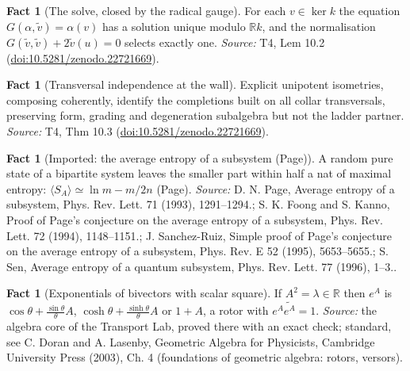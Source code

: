 \documentclass[11pt]{article}
\theoremstyle{definition}
\newtheorem{fact}[theorem]{Fact}
\theoremstyle{plain}
\newcommand{\changedmark}[2]{\marginpar{\raggedright\scriptsize\color{#1}#2}}
\providecommand{\R}{}\renewcommand{\R}{\mathbb{R}}
\begin{document}
\begin{fact}[The solve, closed by the radical gauge]\label{c:sheaf.solve-closed-radical-gauge}
For each $v \in \ker k$ the equation $G(\alpha, \tilde v) = \alpha(v)$ has a solution unique modulo $\R k$, and the normalisation $G(\tilde v, \tilde v) + 2\tilde v(u) = 0$ selects exactly one.
\emph{Source:} T4, Lem 10.2 (\href{https://doi.org/10.5281/zenodo.22721669}{doi:10.5281/zenodo.22721669}).
\end{fact}

\begin{fact}[Transversal independence at the wall]\label{c:sheaf.transversal-independence-wall}
Explicit unipotent isometries, composing coherently, identify the completions built on all collar transversals, preserving form, grading and degeneration subalgebra but not the ladder partner.
\emph{Source:} T4, Thm 10.3 (\href{https://doi.org/10.5281/zenodo.22721669}{doi:10.5281/zenodo.22721669}).
\end{fact}

\begin{fact}[Imported: the average entropy of a subsystem (Page)]\label{c:singularity.imported-page-average-entropy-subsystem}
\changedmark{BurntOrange}{changed since the deposit}
A random pure state of a bipartite system leaves the smaller part within half a nat of maximal entropy: $\langle S_A\rangle \simeq \ln m - m/2n$ (Page).
\emph{Source:} D. N. Page, Average entropy of a subsystem, Phys. Rev. Lett. 71 (1993), 1291--1294.; S. K. Foong and S. Kanno, Proof of Page's conjecture on the average entropy of a subsystem, Phys. Rev. Lett. 72 (1994), 1148--1151.; J. Sanchez-Ruiz, Simple proof of Page's conjecture on the average entropy of a subsystem, Phys. Rev. E 52 (1995), 5653--5655.; S. Sen, Average entropy of a quantum subsystem, Phys. Rev. Lett. 77 (1996), 1--3..
\end{fact}

\begin{fact}[Exponentials of bivectors with scalar square]\label{c:std-algebra.bivector-exponential}
If $A^{2} = \lambda \in \R$ then $e^{A}$ is $\cos\theta + \frac{\sin\theta}{\theta}A$, $\cosh\theta + \frac{\sinh\theta}{\theta}A$ or $1 + A$, a rotor with $e^{A}\widetilde{e^{A}} = 1$.
\emph{Source:} the algebra core of the Transport Lab, proved there with an exact check; standard, see C. Doran and A. Lasenby, Geometric Algebra for Physicists, Cambridge University Press (2003), Ch. 4 (foundations of geometric algebra: rotors, versors).
\end{fact}
\end{document}
